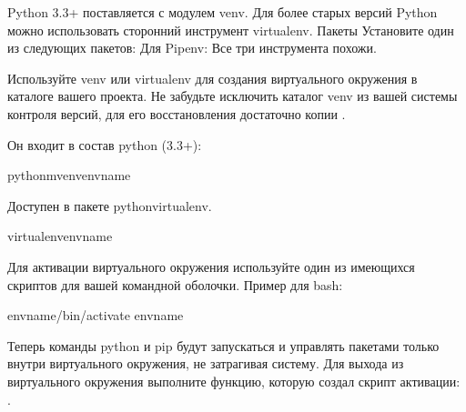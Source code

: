 \documentclass[letterpaper,10pt,russian]{sphinxmanual}
\begin{document}
\sphinxAtStartPar
{}

\sphinxAtStartPar
Python 3.3+ поставляется с модулем venv.
Для более старых версий Python можно использовать сторонний инструмент virtualenv.
Пакеты
Установите один из следующих пакетов:
Для Pipenv:
Все три инструмента похожи.

\sphinxAtStartPar
{}

\sphinxAtStartPar
Используйте venv или virtualenv для создания виртуального окружения в каталоге вашего проекта. Не забудьте исключить каталог venv из вашей системы контроля версий, для его восстановления достаточно копии .

\sphinxAtStartPar
Он входит в состав python (3.3+):

\begin{sphinxVerbatim}[commandchars=\\\{\}]
\PYGZdl{}python\PYGZhy{}mvenvenvname
\end{sphinxVerbatim}

\sphinxAtStartPar
Доступен в пакете python\sphinxhyphen{}virtualenv.

\begin{sphinxVerbatim}[commandchars=\\\{\}]
\PYGZdl{}virtualenvenvname
\end{sphinxVerbatim}

\sphinxAtStartPar
{}

\sphinxAtStartPar
Для активации виртуального окружения используйте один из имеющихся скриптов для вашей командной оболочки. Пример для bash:

\begin{sphinxVerbatim}[commandchars=\\\{\}]
\PYGZdl{}env\PYGZus{}name/bin/activate
envname\PYGZdl{}
\end{sphinxVerbatim}

\sphinxAtStartPar
Теперь команды python и pip будут запускаться и управлять пакетами только внутри виртуального окружения, не затрагивая систему.
Для выхода из виртуального окружения выполните функцию, которую создал скрипт активации: .
\end{document}

